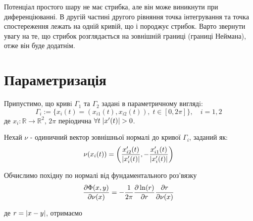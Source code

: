\documentclass[14pt,a4paper]{extarticle}
\newcounter{e}
\numberwithin{equation}{section}
\newcommand{\intl}{\int\limits}
\begin{document}
 Потенціал простого шару не має стрибка, але він може виникнути при диференціюванні. В другій частині другого рівняння точка інтегрування та точка спостереження лежать на одній кривій, що і породжує стрибок. Варто звернути увагу на те, що стрибок розглядається на зовнішній границі (границі Неймана), отже він буде додатнім.
 

  
 \newpage
 \thispagestyle{empty}
 \section{Параметризація}

 Припустимо, що кривi $\Gamma_{1}$ та $\Gamma_{2}$ заданi в параметричному виглядi:
\begin{equation}
	\label{parametrization}
	 \Gamma_{i} := \{ x_{i}(t) = (x_{i1}(t), x_{i2}(t)), \; t \in [ 0, 2\pi ] \} , \quad i = 1, 2
\end{equation}
де $x_{i} : \mathbb{R} \rightarrow \mathbb{R}^2$, $2\pi$ періодична $\forall{t} \; \abs{x'(t)} > 0$.

Нехай $\nu$ - одиничний вектор зовнішньої нормалі до кривої $\Gamma_{i}$, заданий як:
\begin{equation}
	\nu(x_i(t)) = \left(
	\frac{
		x'_{i2}(t)}{\abs{x'_{i}(t)}
	},
	- \frac{
	x'_{i1}(t)}{\abs{x'_{i}(t)}}
	\right)
\end{equation}

Обчислимо похідну по нормалі від фундаментального роз'вязку
$$
\pdv{\Phi(x, y)}{\nu(x)} = -\frac{1}{2\pi} \pdv{\ln(r)}{r}\pdv{r}{\nu(x)}
$$

\indent де $r = \abs{x - y}$, отримаємо
\end{document}
